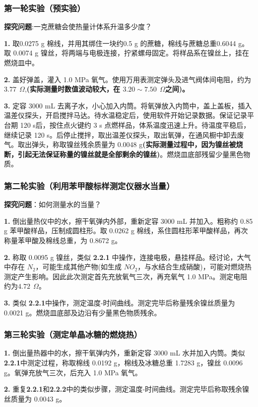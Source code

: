 \documentclass[12pt]{article}
\begin{document}
		 \subsubsection{第一轮实验（预实验）}
		 \textbf{探究问题}:一克蔗糖会使热量计体系升温多少度？\par
		 \textbf{1.} 取0.0275 g 棉线，并用其绑住一块约0.5 g 的蔗糖，棉线与蔗糖总重0.6044 g。取 0.0074 g 镍丝，将两端与电极连接，拧紧螺母固定。将样品系在镍丝上，挂在燃烧皿中。\par
		\textbf{2.} 盖好弹盖，灌入 1.0 MPa 氧气。使用万用表测定弹头及进气阀体间电阻，约为 $ 3.77\ \ \Omega$,\textbf{(实际测量时数值波动较大，在 $3.20 \sim 7.50\ \ \Omega$之间)。}\par
		\textbf{3.} 定容 3000 mL 去离子水，小心加入内筒。将氧弹放入内筒中，盖上盖板，插入温差仪探头，开启搅拌马达。待水温稳定后，使用软件开始记录数据。保证记录平台期 120 s后，按住点火键约 3 s 点燃样品，体系温度迅速上升。待温度平稳后，继续记录 120 s。后停止搅拌，取出温差仪探头，取出氧弹，在通风橱中卸去废气。取出弹头，称取镍丝残余质量为 0.0048 g\textbf{(实际测量过程中，因为镍丝被烧断，引起无法保证称量的镍丝就是全部剩余的镍丝)}。燃烧皿底部残留少量黑色物质。\par


		\subsubsection{第二轮实验（利用苯甲酸标样测定仪器水当量）}
		\textbf{探究问题}：如何测量水的当量？\par
		\textbf{1.} 倒出量热仪中的水，擦干氧弹内外部，重新定容 3000 mL 并加入。粗称约 0.85 g 苯甲酸样品，压制成圆柱形。取 0.0262 g 棉线，系住圆柱形苯甲酸样品，再次称量苯甲酸及棉线总重，为 0.8672 g。\par
		\textbf{2.} 称取 0.0095 g 镍丝，类似 \textbf{2.2.1} 中操作，连接电极，悬挂样品。经讨论，大气中存在 $N_{2}$，可能生成其他产物(如生成 $NO_{2}$，与水结合生成硝酸)，可能对燃烧热测定产生影响。因此此次测定首先充放氧气三次，再充氧气 1.0 MPa。测定电阻约为$ 4.72\ \ \Omega$。\par
		\textbf{3.} 类似 \textbf{2.2.1}中操作，测定温度-时间曲线。测定完毕后称量残余镍丝质量为 0.0021 g。燃烧皿底部及边沿有少量黑色物质残余。

		\subsubsection{第三轮实验（测定单晶冰糖的燃烧热）}
		\textbf{1.} 倒出量热器中的水，擦干氧弹内外，重新定容 3000 mL 水并加入内筒。类似 \textbf{2.2.1}中测定过程，称取棉线 0.0192 g，棉线及冰糖总重 1.7283 g，镍丝 0.0096 g。氧弹充放气三次，后充入 1.0 MPa 氧气。\par
		\textbf{2.} 重复\textbf{2.2.1}和\textbf{2.2.2}中的类似步骤，测定温度-时间曲线。测定完毕后称取残余镍丝质量为 0.0043 g。\par
\end{document}
